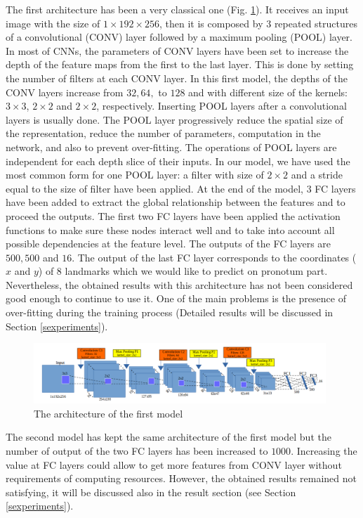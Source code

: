 \documentclass[review]{elsarticle}
\begin{document}
The first architecture has been a very classical one
(Fig. \ref{fignet1}). It receives an input image with the size of $1
\times 192 \times 256$, then it is composed by $3$ repeated structures
of a convolutional (CONV) layer followed by a maximum pooling (POOL)
layer. In most of CNNs, the parameters of CONV layers have been set to
increase the depth of the feature maps from the first  to the last
layer. This is done by setting the number of filters at each CONV
layer. In this first model, the depths of the CONV layers increase
from $32, 64, $ to $128$ and with different size of the kernels: $3
\times 3$, $2 \times 2$ and $2 \times 2$, respectively. Inserting POOL
layers after a convolutional layers is usually done. The POOL layer
progressively reduce the spatial size of the representation, reduce
the number of parameters, computation in the network, and also to
prevent over-fitting. The operations of POOL layers are independent
for each depth slice of their inputs. In our model, we have used the
most common form for one POOL layer: a filter with size of $2 \times
2$ and a stride equal to the size of filter have been applied. At the
end of the model, $3$ FC layers have been added to extract the global
relationship between the features and to proceed the outputs. The
first two FC layers have been applied the activation functions to make
sure these nodes interact well and to take into account all possible
dependencies at the feature level. The outputs of the FC layers are
$500, 500$ and $16$. The output of the last FC layer corresponds to
the coordinates ($x$ and $y$) of $8$ landmarks which we would like to
predict on pronotum part. Nevertheless, the obtained results with this
architecture has not been considered good enough to continue to use
it. One of the main problems is the presence of over-fitting during
the training process (Detailed results will be discussed in Section
\ref{sexperiments}).

\begin{figure}[!h]
	\centering
	\includegraphics[width=0.98\textwidth]{images/net1}
	\caption{The architecture of the first model}
	\label{fignet1}
\end{figure}

The second model has kept the same architecture of the first model but
the number of output of the two FC layers has been increased to
$1000$. Increasing the value at FC layers could allow to get more
features from CONV layer without requirements of computing
resources. However, the obtained results remained not satisfying, it
will be discussed also in the result section (see Section
\ref{sexperiments}).
\end{document}
